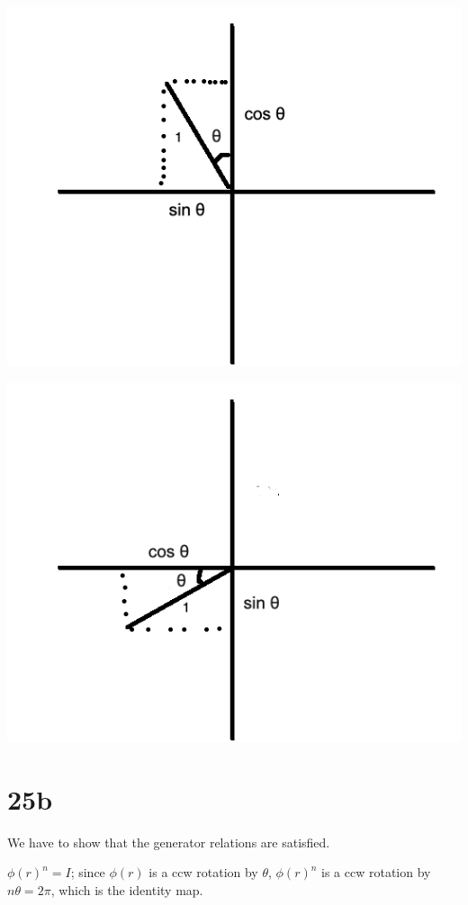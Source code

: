 \documentclass{article}
\begin{document}
\includegraphics[scale=0.65]{basis1.png}

\includegraphics[scale=0.65]{basis2.png}

\section*{25b}

We have to show that the generator relations are satisfied.

$\phi(r)^n = I$; since $\phi(r)$ is a ccw rotation by $\theta$, $\phi(r)^n$ is a ccw rotation by $n\theta = 2\pi$, which is the identity map.
\end{document}
